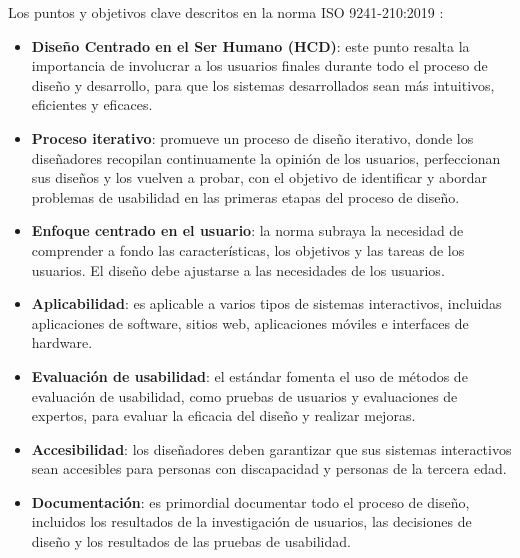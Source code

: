 Los puntos y objetivos clave descritos en la norma ISO 9241-210:2019 \cite{ref62}:

\begin{itemize}
    \item \textbf{Diseño Centrado en el Ser Humano (HCD)}: este punto resalta la importancia de involucrar a los usuarios finales durante todo el proceso de diseño y desarrollo, para que los sistemas desarrollados sean más intuitivos, eficientes y eficaces.
    \item \textbf{Proceso iterativo}: promueve un proceso de diseño iterativo, donde los diseñadores recopilan continuamente la opinión de los usuarios, perfeccionan sus diseños y los vuelven a probar, con el objetivo de identificar y abordar problemas de usabilidad en las primeras etapas del proceso de diseño.
    \item \textbf{Enfoque centrado en el usuario}: la norma subraya la necesidad de comprender a fondo las características, los objetivos y las tareas de los usuarios. El diseño debe ajustarse a las necesidades de los usuarios.
    \item \textbf{Aplicabilidad}: es aplicable a varios tipos de sistemas interactivos, incluidas aplicaciones de software, sitios web, aplicaciones móviles e interfaces de hardware.
    \item \textbf{Evaluación de usabilidad}: el estándar fomenta el uso de métodos de evaluación de usabilidad, como pruebas de usuarios y evaluaciones de expertos, para evaluar la eficacia del diseño y realizar mejoras.
    \item \textbf{Accesibilidad}: los diseñadores deben garantizar que sus sistemas interactivos sean accesibles para personas con discapacidad y personas de la tercera edad.
    \item \textbf{Documentación}: es primordial documentar todo el proceso de diseño, incluidos los resultados de la investigación de usuarios, las decisiones de diseño y los resultados de las pruebas de usabilidad.
\end{itemize}